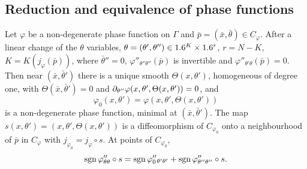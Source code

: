 \subsection{Reduction and equivalence of phase functions}

\begin{lemma}\label{hj:lem:reduce}
  Let $\varphi$ be a non-degenerate phase function on $\Gamma$ and $\bar
  p=(\bar x,\bar\theta)\in C_\varphi$.  After a linear change of the $\theta$
  variables, $\theta=(\theta',\theta'')\in1.6^{K}\times1.6^r$, $r=N-K$,
  $K=K(j_\varphi(\bar p))$, where $\bar\theta''=0$, $\varphi''_{\theta''\theta''}
  (\bar p)$ is invertible and $\varphi''_{\theta'\theta}(\bar p)=0$.  Then near
  $(\bar x,\bar\theta')$ there is a unique smooth $\Theta(x,\theta')$,
  homogeneous of degree one, with $\Theta(\bar x,\bar\theta')=0$ and
  $\partial_{\theta''}\varphi(x,\theta',\Theta(x,\theta'))=0$, and
  \begin{equation*}
    \varphi_0(x,\theta')=\varphi(x,\theta',\Theta(x,\theta'))
  \end{equation*}
  is a non-degenerate phase function, minimal at $(\bar x,\bar\theta')$.  The map
  $s(x,\theta')=(x,\theta',\Theta(x,\theta'))$ is a diffeomorphism of
  $C_{\varphi_0}$ onto a neighbourhood of $\bar p$ in $C_\varphi$ with
  $j_{\varphi_0}=j_\varphi\circ s$.  At points of $C_{\varphi_0}$,
  \begin{equation}\label{hj:eq:sgn-add}
    \operatorname{sgn}\varphi''_{\theta\theta}\circ s=\operatorname{sgn}\varphi_0''{}_{\theta'\theta'}+
    \operatorname{sgn}\varphi''_{\theta''\theta''}\circ s .
  \end{equation}
\end{lemma}
